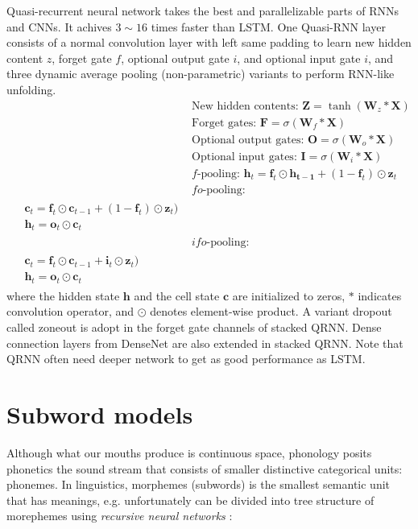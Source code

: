 Quasi-recurrent neural network takes the best and parallelizable parts of RNNs and CNNs.
It achives $3\sim16$ times faster than LSTM.
One Quasi-RNN layer consists of a normal convolution layer with left same padding to learn new hidden content $z$, forget gate $f$, optional output gate $i$, and optional input gate $i$, and three dynamic average pooling (non-parametric) variants to perform RNN-like unfolding.
\begin{align}
&\text{New hidden contents: } \bm{Z} = \tanh(\bm{W}_z * \bm{X}) \nonumber \\
&\text{Forget gates: } \bm{F} = \sigma(\bm{W}_f * \bm{X}) \nonumber \\
&\text{Optional output gates: } \bm{O} = \sigma(\bm{W}_o * \bm{X}) \nonumber \\
&\text{Optional input gates: } \bm{I} = \sigma(\bm{W}_i * \bm{X}) \nonumber \\
&\textit{f}\text{-pooling: } \bm{h}_t = \bm{f}_t \odot \bm{h_{t-1}} + (1 - \bm{f}_t) \odot \bm{z}_t \nonumber \\
&\textit{fo}\text{-pooling: } \nonumber \\
\begin{split}
&\bm{c}_t = \bm{f}_t \odot \bm{c}_{t-1} + (1-\bm{f}_t) \odot \bm{z}_t) \nonumber \\
&\bm{h}_t = \bm{o}_t \odot \bm{c}_t \nonumber
\end{split} \nonumber \\
&\textit{ifo}\text{-pooling: } \nonumber \\
\begin{split}
&\bm{c}_t = \bm{f}_t \odot \bm{c}_{t-1} + \bm{i}_t \odot \bm{z}_t) \nonumber \\
&\bm{h}_t = \bm{o}_t \odot \bm{c}_t \nonumber
\end{split} \nonumber
\end{align}
where the hidden state $\bm{h}$ and the cell state $\bm{c}$ are initialized to zeros, $*$ indicates convolution operator, and $\odot$ denotes element-wise product.
A variant dropout called zoneout is adopt in the forget gate channels of stacked QRNN.
Dense connection layers from DenseNet are also extended in stacked QRNN.
Note that QRNN often need deeper network to get as good performance as LSTM.

\section{Subword models}

Although what our mouths produce is continuous space, phonology posits phonetics the sound stream that consists of smaller distinctive categorical units: phonemes.
In linguistics, morphemes (subwords) is the smallest semantic unit that has meanings, e.g. unfortunately can be divided into tree structure of morephemes using \emph{recursive neural networks} :

